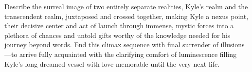  Describe the surreal image of two entirely separate realities, Kyle's realm and the transcendent realm, juxtaposed and crossed together, making Kyle a nexus point, their decisive center and act of launch through immense, mystic forces into a plethora of chances and untold gifts worthy of the knowledge needed for his journey beyond words. End this climax sequence with final surrender of illusions---to arrive fully acquainted with the clarifying comfort of luminescence filling Kyle's long dreamed vessel with love memorable until the very next life.